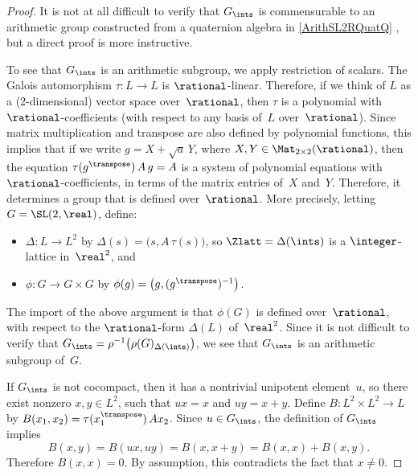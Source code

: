 \begin{proof}
It is not at all difficult to verify that $G_\ints$ is commensurable to an arithmetic group constructed from a quaternion algebra in \cref{ArithSL2RQuatQ} , but a direct proof is more instructive.

To see that $G_\ints$ is an arithmetic subgroup, we apply restriction of scalars.
The Galois automorphism $\tau \colon L \to L$ is $\rational$-linear. Therefore, if we think of $L$ as a ($2$-dimensional) vector space over~$\rational$, then $\tau$ is a polynomial with $\rational$-coefficients (with respect to any basis of~$L$ over~$\rational$). Since matrix multiplication and transpose are also defined by polynomial functions, this implies that if we write $g = X + \sqrt{a} \, Y$, where $X,Y \in \Mat_{2 \times 2}(\rational)$, then the equation $\tau(g^\transpose) \, A \, g = A$ is a system of polynomial equations with $\rational$-coefficients, in terms of the matrix entries of~$X$ and~$Y$. Therefore, it determines a group that is defined over~$\rational$. 
More precisely, letting $G = \SL(2,\real)$, define:
	\begin{itemize}
	\item $\Delta \colon L \to L^2$ by $\Delta(s) = \bigl( s, A \, \tau(s) \bigr)$, so $\Zlatt = \Delta(\ints)$ is a $\integer$-lattice in~$\real^2$,
	and
	\item $\phi \colon G \to G \times G$ by $\phi(g) = \bigl( g, (g^\transpose)^{-1} \bigr)$. 
	\end{itemize}
The import of the above argument is that $\phi(G)$ is defined over~$\rational$, with respect to the $\rational$-form $\Delta(L)$ of~$\real^2$. Since it is not difficult to verify that $G_\ints = \rho^{-1} \bigl( \rho(G)_{\Delta(\ints)} \bigr)$, we see that $G_\ints$ is an arithmetic subgroup of~$G$.

If $G_\ints$ is not cocompact, then it has a nontrivial unipotent element~$u$, so there exist nonzero $ x,  y \in L^2$, such that $u  x =  x$ and $u  y =  x + y$. 
Define $B \colon L^2 \times L^2 \to L$ by $B( x_1 ,  x_2) = \tau( x{}_1^\transpose) \, A  x_2$. Since $u \in G_\ints$, the definition of $G_\ints$ implies
	$$ B( x,  y) = B(u x, u  y) = B( x, x + y) = B( x,  x) + B( x,  y) .$$
Therefore $B( x, x ) = 0$. By assumption, this contradicts the fact that $x \neq  0$.
\end{proof}

